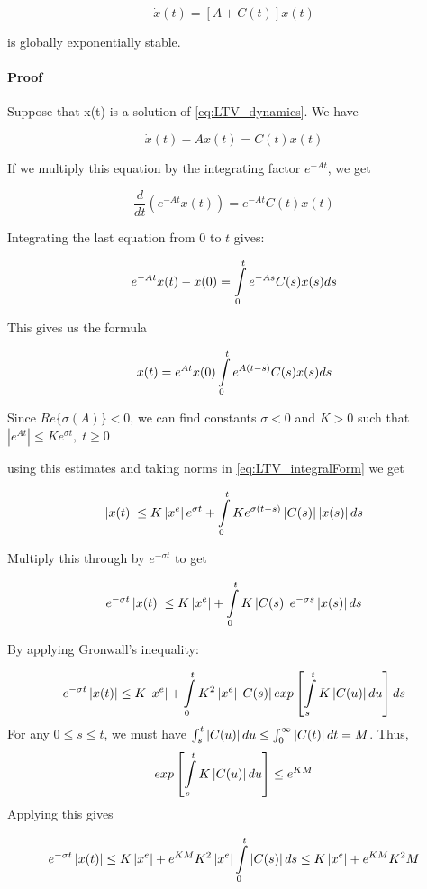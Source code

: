 \documentclass[conference]{IEEEtran}
\begin{document}
\begin{equation}
\dot{x}(t)=[A+C(t)]x(t)\label{eq:LTV_dynamics}
\end{equation}

is globally exponentially stable.

\paragraph{Proof}
Suppose that x(t) is a solution of \eqref{eq:LTV_dynamics}.
We have 

\[
\dot{x}(t)-Ax(t)=C(t)x(t)
\]

If we multiply this equation by the integrating factor
$e^{-At}$, we get 

\[
\frac{d}{dt}\left(e^{-At}x(t)\right)=e^{-At}C(t)x(t)
\]

Integrating the last equation from $0$ to $t$ gives:

\[
e^{-At}x(t)-x(0)=\intop_{0}^{t}e^{-As}C(s)x(s)ds
\]

This gives us the formula

\begin{equation}
x(t)=e^{At}x(0)\intop_{0}^{t}e^{A(t-s)}C(s)x(s)ds\label{eq:LTV_integralForm}
\end{equation}

Since $Re\{\sigma(A)\}<0$, we can find constants $\sigma<0$ and
$K>0$ such that $\left|e^{At}\right|\leq Ke^{\sigma t},\;t\geq0$ 

using this estimates and taking norms in \eqref{eq:LTV_integralForm}
we get 

\[
\left|x(t)\right|\leq K\left|x^{e}\right|e^{\sigma t}+\intop_{0}^{t}Ke^{\sigma(t-s)}\left|C(s)\right|\left|x(s)\right|ds
\]

Multiply this through by $e^{-\sigma t}$ to get

\[
e^{-\sigma t}\left|x(t)\right|\leq K\left|x^{e}\right|+\intop_{0}^{t}K\left|C(s)\right|e^{-\sigma s}\left|x(s)\right|ds
\]

By applying Gronwall's inequality:

\[
e^{-\sigma t}\left|x(t)\right|\leq K\left|x^{e}\right|+\intop_{0}^{t}K^{2}\left|x^{e}\right|\left|C(s)\right|exp\left[\intop_{s}^{t}K\left|C(u)\right|du\right]ds
\]
For any $0\le s\le t$, we must have $\intop_{s}^{t}\left|C(u)\right|du\le\intop_{0}^{\infty}\left|C(t)\right|dt=M$.
Thus, 
\[
exp\left[\intop_{s}^{t}K\left|C(u)\right|du\right]\le e^{KM}
\]
Applying this gives

\[
e^{-\sigma t}\left|x(t)\right|\leq K\left|x^{e}\right|+e^{KM}K^{2}\left|x^{e}\right|\intop_{0}^{t}\left|C(s)\right|ds\le K\left|x^{e}\right|+e^{KM}K^{2}M
\]
\end{document}
